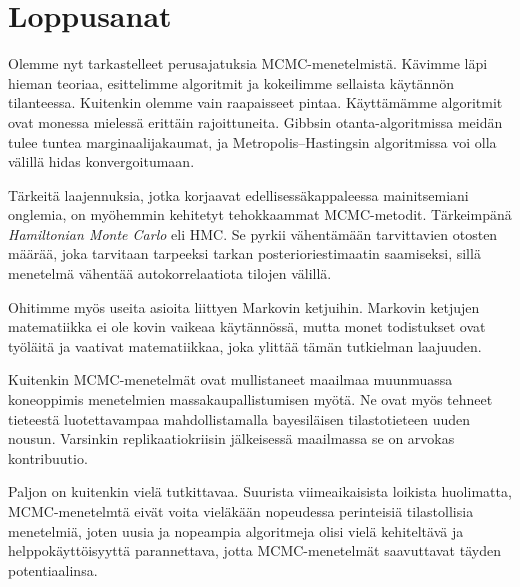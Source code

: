 \chapter{Loppusanat}

Olemme nyt tarkastelleet perusajatuksia MCMC-menetelmistä. Kävimme läpi hieman teoriaa, esittelimme algoritmit ja kokeilimme sellaista käytännön tilanteessa. Kuitenkin olemme vain raapaisseet pintaa. Käyttämämme algoritmit ovat monessa mielessä erittäin rajoittuneita. Gibbsin otanta-algoritmissa meidän tulee tuntea marginaalijakaumat, ja Metropolis--Hastingsin algoritmissa voi olla välillä hidas konvergoitumaan. 

Tärkeitä laajennuksia, jotka korjaavat edellisessäkappaleessa mainitsemiani onglemia, on myöhemmin kehitetyt tehokkaammat MCMC-metodit. Tärkeimpänä \textit{Hamiltonian Monte Carlo} eli HMC. Se pyrkii vähentämään tarvittavien otosten määrää, joka tarvitaan tarpeeksi tarkan posterioriestimaatin saamiseksi, sillä menetelmä vähentää autokorrelaatiota tilojen välillä.

Ohitimme myös useita asioita liittyen Markovin ketjuihin. Markovin ketjujen matematiikka ei ole kovin vaikeaa käytännössä, mutta monet todistukset ovat työläitä ja vaativat matematiikkaa, joka ylittää tämän tutkielman laajuuden.

Kuitenkin MCMC-menetelmät ovat mullistaneet maailmaa muunmuassa koneoppimis menetelmien massakaupallistumisen myötä. Ne ovat myös tehneet tieteestä luotettavampaa mahdollistamalla bayesiläisen tilastotieteen uuden nousun. Varsinkin replikaatiokriisin jälkeisessä maailmassa se on arvokas kontribuutio.

Paljon on kuitenkin vielä tutkittavaa. Suurista viimeaikaisista loikista huolimatta, MCMC-menetelmtä eivät voita vieläkään nopeudessa perinteisiä tilastollisia menetelmiä, joten uusia ja nopeampia algoritmeja olisi vielä kehiteltävä ja helppokäyttöisyyttä parannettava, jotta MCMC-menetelmät saavuttavat täyden potentiaalinsa.